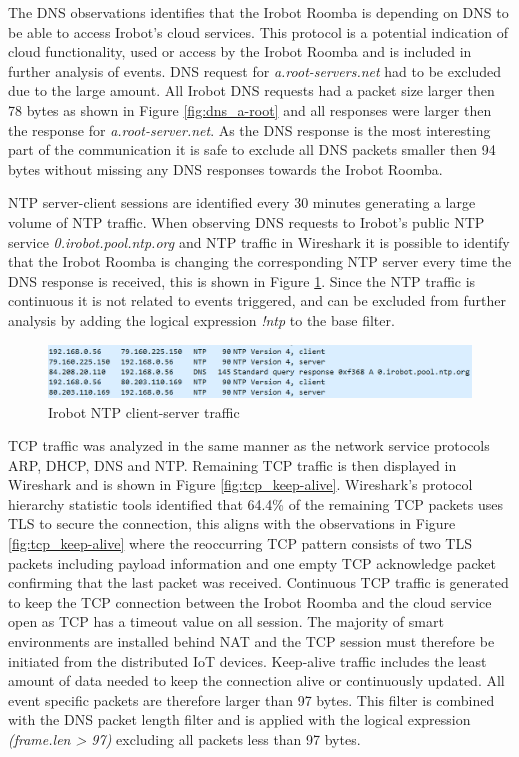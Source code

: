 The DNS observations identifies that the Irobot Roomba is depending on DNS to be able to access Irobot's cloud services. This protocol is a potential indication of cloud functionality, used or access by the Irobot Roomba and is included in further analysis of events. DNS request for \textit{a.root-servers.net} had to be excluded due to the large amount. All Irobot DNS requests had a packet size larger then 78 bytes as shown in Figure \ref{fig:dns_a-root} and all responses were larger then the response for \textit{a.root-server.net}. As the DNS response is the most interesting part of the communication it is safe to exclude all DNS packets smaller then 94 bytes without missing any DNS responses towards the Irobot Roomba. 

NTP server-client sessions are identified every 30 minutes generating a large volume of NTP traffic. When observing DNS requests to Irobot's public NTP service \textit{0.irobot.pool.ntp.org} and NTP traffic in Wireshark it is possible to identify that the Irobot Roomba is changing the corresponding NTP server every time the DNS response is received, this is shown in Figure \ref{fig:irobot_ntp_dns}. Since the NTP traffic is continuous it is not related to events triggered, and can be excluded from further analysis by adding the logical expression \textit{!ntp} to the base filter.

\begin{figure}[H]
    \centering
    \includegraphics[width=\textwidth]{figures/NTP-irobot.png}
    \caption{Irobot NTP client-server traffic}
    \label{fig:irobot_ntp_dns}
\end{figure}

TCP traffic was analyzed in the same manner as the network service protocols ARP, DHCP, DNS and NTP. Remaining TCP traffic is then displayed in Wireshark and is shown in Figure \ref{fig:tcp_keep-alive}. Wireshark's protocol hierarchy statistic tools identified that 64.4\% of the remaining TCP packets uses TLS to secure the connection, this aligns with the observations in Figure \ref{fig:tcp_keep-alive} where the reoccurring TCP pattern consists of two TLS packets including payload information and one empty TCP acknowledge packet confirming that the last packet was received. Continuous TCP traffic is generated to keep the TCP connection between the Irobot Roomba and the cloud service open as TCP has a timeout value on all session. The majority of smart environments are installed behind NAT and the TCP session must therefore be initiated from the distributed IoT devices.  Keep-alive traffic includes the least amount of data needed to keep the connection alive or continuously updated. All event specific packets are therefore larger than 97 bytes.  This filter is combined with the DNS packet length filter and is applied with the logical expression \textit{(frame.len > 97)} excluding all packets less than 97 bytes.


